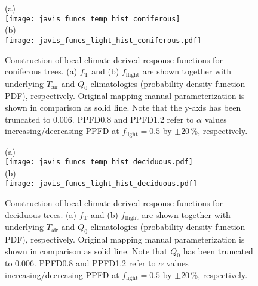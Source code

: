 \documentclass[bg, manuscript]{copernicus}
\begin{document}
\begin{figure}[t]
  \centering
  (a)\\
  \texttt{[image: javis\_funcs\_temp\_hist\_coniferous]}\\
  (b)\\
  \texttt{[image: javis\_funcs\_light\_hist\_coniferous.pdf]}
\caption{Construction of local climate derived response functions for coniferous trees. (a) $f_\mathrm{T}$ and (b) $f_\mathrm{flight}$ are shown together with underlying $T_\mathrm{air}$ and $Q_0$ climatologies (probability density function - PDF), respectively. Original mapping manual parameterization is shown in comparison as solid line. Note that the y-axis has been truncated to $0.006$. PPFD0.8 and PPFD1.2 refer to $\alpha$ values increasing/decreasing PPFD at $f_\mathrm{light}=0.5$ by $\pm 20\,\%$, respectively.}
\label{fig:f_temp_spruce}
\end{figure}

\begin{figure}[t]
  \centering
  (a)\\
  \texttt{[image: javis\_funcs\_temp\_hist\_deciduous.pdf]}\\
  (b)\\
  \texttt{[image: javis\_funcs\_light\_hist\_deciduous.pdf]}
\caption{Construction of local climate derived response functions for deciduous trees. (a) $f_\mathrm{T}$ and (b) $f_\mathrm{flight}$ are shown together with underlying $T_\mathrm{air}$ and $Q_0$ climatologies (probability density function - PDF), respectively. Original mapping manual parameterization is shown in comparison as solid line. Note that $Q_0$ has been truncated to $0.006$. PPFD0.8 and PPFD1.2 refer to $\alpha$ values increasing/decreasing PPFD at $f_\mathrm{light}=0.5$ by $\pm 20\,\%$, respectively.}
\label{fig:f_temp_birch}
\end{figure}

\clearpage

\noappendix       %


\end{document}
